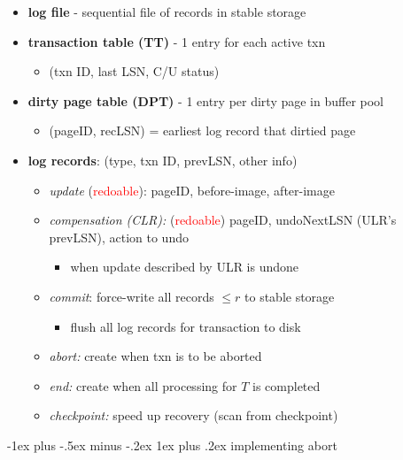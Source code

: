 \documentclass[10pt, landscape]{article}
\makeatletter
\renewcommand{\subsubsection}{\@startsection{subsubsection}{3}{0mm}%
  {-1ex plus -.5ex minus -.2ex}%
  {1ex plus .2ex}%
{\normalfont\small\bfseries}}%
\makeatother
\begin{document}
\begin{multicols*}{4}
  \begin{itemize}
    \item \textbf{log file} - sequential file of records in stable storage
    \item \textbf{transaction table (TT)} - 1 entry for each active txn
      \begin{itemize}
        \item (txn ID, last LSN, C/U status)
      \end{itemize}
    \item \textbf{dirty page table (DPT)} - 1 entry per dirty page in buffer pool
      \begin{itemize}
        \item (pageID, recLSN) = earliest log record that dirtied page
      \end{itemize}
    \item \textbf{log records}: (type, txn ID, prevLSN, other info)
      \begin{itemize}
        \item \textit{update} (\attention \textcolor{red}{redoable}): pageID, before-image, after-image
        \item \textit{compensation (CLR):} (\attention \textcolor{red}{redoable}) pageID, undoNextLSN (ULR's prevLSN), action to undo
          \begin{itemize}
            \item when update described by ULR is undone
          \end{itemize}
        \item \textit{commit}: force-write all records $\leq r$ to stable storage
          \begin{itemize}
            \item flush all log records for transaction to disk
          \end{itemize}
        \item \textit{abort:} create when txn is to be aborted
        \item \textit{end:} create when all processing for $T$ is completed
        \item \textit{checkpoint:} speed up recovery (scan from checkpoint)
      \end{itemize}
  \end{itemize}

  \subsubsection{implementing abort}


\end{multicols*}
\end{document}
